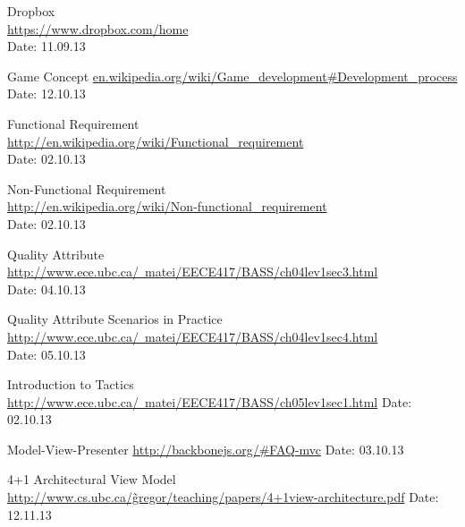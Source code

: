 \begin{thebibliography}{99}
	Dropbox \\
	\href{https://www.dropbox.com/home}{https://www.dropbox.com/home} \\
	Date: 11.09.13

	Game Concept\newline
	\href {en.wikipedia.org/wiki/Game_development#Development_process}{en.wikipedia.org/wiki/Game\_development\#Development\_process}\newline
	Date: 12.10.13

	Functional Requirement \\
	\href{http://en.wikipedia.org/wiki/Functional_requirement}{http://en.wikipedia.org/wiki/Functional\_requirement} \\
	Date: 02.10.13

	Non-Functional Requirement \\
	\href{http://en.wikipedia.org/wiki/Non-functional_requirement}{http://en.wikipedia.org/wiki/Non-functional\_requirement} \\
	Date: 02.10.13

	Quality Attribute \\
	\href{http://www.ece.ubc.ca/~matei/EECE417/BASS/ch04lev1sec3.html}{http://www.ece.ubc.ca/~matei/EECE417/BASS/ch04lev1sec3.html} \\
	Date: 04.10.13

	Quality Attribute Scenarios in Practice \\ 
	\href{http://www.ece.ubc.ca/~matei/EECE417/BASS/ch04lev1sec4.html}{http://www.ece.ubc.ca/~matei/EECE417/BASS/ch04lev1sec4.html} \\
	Date: 05.10.13

	Introduction to Tactics \newline
	\href {http://www.ece.ubc.ca/~matei/EECE417/BASS/ch05lev1sec1.html}{http://www.ece.ubc.ca/~matei/EECE417/BASS/ch05lev1sec1.html} \newline
	Date: 02.10.13

	Model-View-Presenter\newline
	\href {http://backbonejs.org/\#FAQ-mvc}{http://backbonejs.org/\#FAQ-mvc}\newline
	Date: 03.10.13

	4+1 Architectural View Model
	\href{http://www.cs.ubc.ca/~gregor/teaching/papers/4+1view-architecture.pdf}{http://www.cs.ubc.ca/\~gregor/teaching/papers/4+1view-architecture.pdf}
	Date: 12.11.13


\end{thebibliography}
